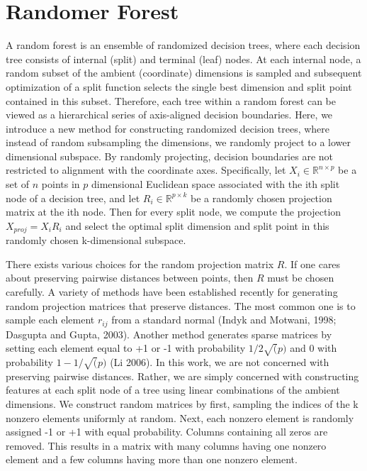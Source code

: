 \documentclass{article} %
\newcommand{\jovo}[1]{{\color{magenta}{\it jovo says: #1}}}
\begin{document}
\jovo{outlines of the paper are verbose, and it should be clear from the introductory content what you will be doing. i removed yours}


\section{Randomer Forest}
A random forest is an ensemble of randomized decision trees, where each decision tree consists of internal (split) and terminal (leaf) nodes. At each internal node, a random subset of the ambient (coordinate) dimensions is sampled and subsequent optimization of a split function selects the single best dimension and split point contained in this subset. Therefore, each tree within a random forest can be viewed as a hierarchical series of axis-aligned decision boundaries. Here, we introduce a new method for constructing randomized decision trees, where instead of random subsampling the dimensions, we randomly project to a lower dimensional subspace. By randomly projecting, decision boundaries are not restricted to alignment with the coordinate axes. Specifically, let $X_i \in \mathbb{R}^{n\times p}$ be a set of $n$ points in $p$ dimensional Euclidean space associated with the ith split node of a decision tree, and let $R_i \in \mathbb{R}^{p\times k}$ be a randomly chosen projection matrix at the ith node. Then for every split node, we compute the projection $X_{proj} = X_iR_i$ and select the optimal split dimension and split point in this randomly chosen k-dimensional subspace.

There exists various choices for the random projection matrix $R$. If one cares about preserving pairwise distances between points, then $R$ must be chosen carefully. A variety of methods have been established recently for generating random projection matrices that preserve distances. The most common one is to sample each element $r_{ij}$ from a standard normal (Indyk and Motwani, 1998; Dasgupta and Gupta, 2003). Another method generates sparse matrices by setting each element equal to +1 or -1 with probability $1/2\sqrt(p)$ and 0 with probability $1 - 1/\sqrt(p)$ (Li 2006). In this work, we are not concerned with preserving pairwise distances. Rather, we are simply concerned with constructing features at each split node of a tree using linear combinations of the ambient dimensions. We construct random matrices by first, sampling the indices of the k nonzero elements uniformly at random. Next, each nonzero element is randomly assigned -1 or +1 with equal probability. Columns containing all zeros are removed. This results in a matrix with many columns having one nonzero element and a few columns having more than one nonzero element.
\end{document}
